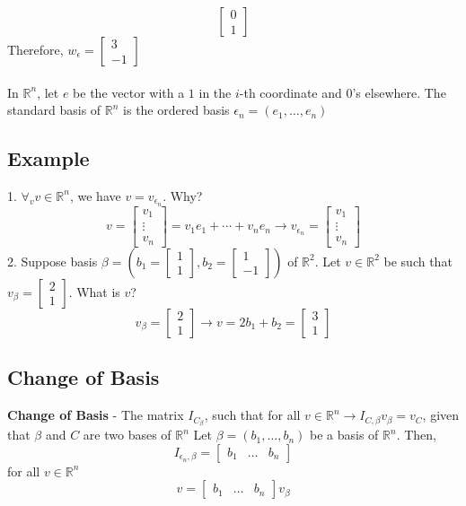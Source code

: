 \begin{enumerate}
\[  \begin{bmatrix} 0 \\ 1 \end{bmatrix}
\] Therefore, $w_{\epsilon} = \begin{bmatrix} 3 \\ -1 \end{bmatrix}$ \\\\
In $\mathbb{R}^n$, let $e$ be the vector with a $1$ in the $i$-th coordinate and $0$'s elsewhere. The standard basis of $\mathbb{R}^n$ is the ordered basis $\epsilon_n = (e_1, \dots, e_n)$
\subsection{Example}
1. $\forall_v v \in \mathbb{R}^n$, we have $v = v_{\epsilon_n}$. Why?
\[
  v = \begin{bmatrix} v_1 \\ \vdots \\ v_n \end{bmatrix} = v_1e_1 + \cdots + v_ne_n \rightarrow
  v_\epsilon_n = \begin{bmatrix} v_1 \\ \vdots \\ v_n \end{bmatrix}
\]
2. Suppose basis $\beta = (b_1 = \begin{bmatrix} 1 \\ 1 \end{bmatrix}, b_2 = \begin{bmatrix} 1 \\ -1 
\end{bmatrix})$ of $\mathbb{R}^2$. Let $v \in \mathbb{R}^2$ be such that $v_\beta = \begin{bmatrix} 2 \\ 1 \end{bmatrix}$. What is $v$? 
\[
  v_\beta = \begin{bmatrix} 2 \\ 1 \end{bmatrix} \rightarrow v = 2b_1 + b_2 = \begin{bmatrix} 3 \\ 1 
  \end{bmatrix}
\]
\subsection{Change of Basis}
\textbf{Change of Basis} - The matrix $I_{C_\beta}$, such that for all $v \in \mathbb{R}^n \rightarrow
I_{C, \beta}v_{\beta} = v_{C}$, given that $\beta$ and $C$ are two bases of $\mathbb{R}^n$
Let $\beta = (b_1, \dots, b_n)$ be a basis of $\mathbb{R}^n$. Then,
\[
  I_{\epsilon_n, \beta} = \begin{bmatrix} b_1 & \dots & b_n \end{bmatrix}
\] for all $v \in \mathbb{R}^n$
\[
  v = \begin{bmatrix} b_1 & \dots & b_n \end{bmatrix} v_\beta
\]

\end{enumerate}
